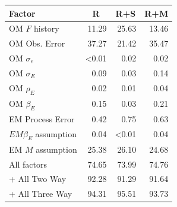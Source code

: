 \begin{center}
\begin{tabular}{lrrr}
\hline\hline
\multicolumn{1}{l}{Factor}&\multicolumn{1}{c}{R}&\multicolumn{1}{c}{R+S}&\multicolumn{1}{c}{R+M}\tabularnewline
\hline
OM $F$ history&11.29&25.63&13.46\tabularnewline
OM Obs. Error&37.27&21.42&35.47\tabularnewline
OM $\sigma_e$&\textless  0.01& 0.02& 0.02\tabularnewline
OM $\sigma_E$& 0.09& 0.03& 0.14\tabularnewline
OM $\rho_{E}$& 0.02& 0.01& 0.04\tabularnewline
OM $\beta_{E}$& 0.15& 0.03& 0.21\tabularnewline
EM Process Error& 0.42& 0.75& 0.63\tabularnewline
$EM \beta_{E}$ assumption& 0.04&\textless  0.01& 0.04\tabularnewline
EM $M$ assumption&25.38&26.10&24.68\tabularnewline
All factors&74.65&73.99&74.76\tabularnewline
+ All Two Way&92.28&91.29&91.64\tabularnewline
+ All Three Way&94.31&95.51&93.73\tabularnewline
\hline
\end{tabular}\end{center}
